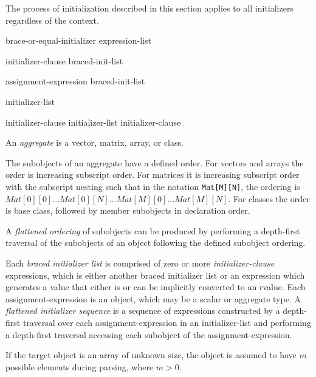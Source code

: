 \p The process of initialization described in this section applies to all
initializers regardless of the context.

\begin{grammar}
  \br
  brace-or-equal-initializer\br
  \terminal{(} expression-list \terminal{)}\br

  \br
  \terminal{=} initializer-clause\br
  braced-init-list\br

  \br
  assignment-expression\br
  braced-init-list\br

  \br
  \terminal{\{} initializer-list \opt{\terminal{,}} \terminal{\}}\br
  \terminal{\{} \terminal{\}}\br

  \br
  initializer-clause\br
  initializer-list \terminal{,} initializer-clause\br
\end{grammar}


\p An \textit{aggregate} is a vector, matrix, array, or class.

\p The subobjects of an aggregate have a defined order. For vectors and arrays
the order is increasing subscript order. For matrices it is increasing subscript
order with the subscript nesting such that in the notation
\texttt{Mat[M][N]}, the ordering is \(Mat[0][0]...Mat[0][N]...
Mat[M][0]...Mat[M][N]\). For classes the order is base class, followed by member
subobjects in declaration order.

\p A \textit{flattened ordering} of subobjects can be produced by performing a
depth-first traversal of the subobjects of an object following the defined
subobject ordering.

\p Each \textit{braced initializer list} is comprised of zero or more
\textit{initializer-clause} expressions, which is either another braced
initializer list or an expression which generates a value that either is or can
be implicitly converted to an rvalue. Each assignment-expression is an object,
which may be a scalar or aggregate type. A \textit{flattened initializer
sequence} is a sequence of expressions constructed by a depth-first traversal
over each assignment-expression in an initializer-list and performing a
depth-first traversal accessing each subobject of the assignment-expression.

\p If the target object is an array of unknown size, the object is assumed to
have \(m\) possible elements during parsing, where \(m>0\).

